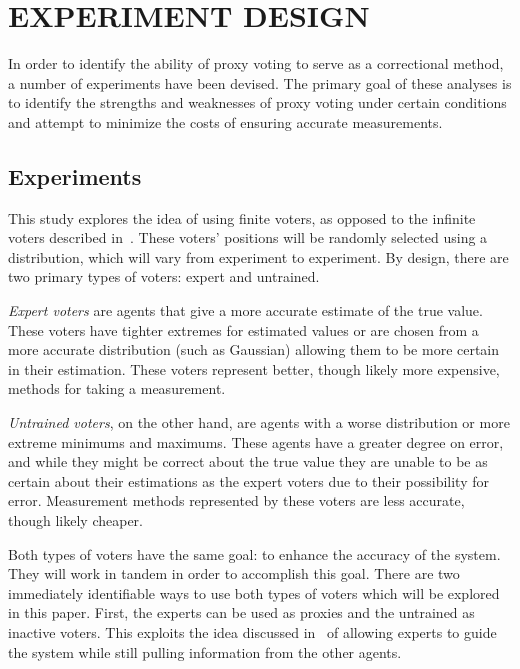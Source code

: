 %
%

\chapter{EXPERIMENT DESIGN}\label{ch:experiment-design}
In order to identify the ability of proxy voting to serve as a correctional
method, a number of experiments have been devised.
The primary goal of these analyses is to identify the strengths and
weaknesses of proxy voting under certain conditions and attempt to minimize
the costs of ensuring accurate measurements.

\section{Experiments}\label{sec:experiments}
This study explores the idea of using finite voters, as opposed to the
infinite voters described in~\cite{Cohensius2017}.
These voters' positions will be randomly selected using a distribution, which
will vary from experiment to experiment.
By design, there are two primary types of voters: expert and untrained.

\textit{Expert voters} are agents that give a more accurate estimate of the
true value.
These voters have tighter extremes for estimated values or are chosen from
a more accurate distribution (such as Gaussian) allowing them to be more
certain in their estimation.
These voters represent better, though likely more expensive, methods for
taking a measurement.  %

\textit{Untrained voters}, on the other hand, are agents with a worse
distribution or more extreme minimums and maximums.
These agents have a greater degree on error, and while they might be correct
about the true value they are unable to be as certain about their estimations
as the expert voters due to their possibility for error.
Measurement methods represented by these voters are less accurate, though
likely cheaper.  %

Both types of voters have the same goal: to enhance the accuracy of the system.
They will work in tandem in order to accomplish this goal.
There are two immediately identifiable ways to use both types of voters which
will be explored in this paper.
First, the experts can be used as proxies and the untrained as inactive voters.
This exploits the idea discussed in~\cite{Miller1969, Mueller1972} of
allowing experts to guide the system while still pulling information from the
other agents.

